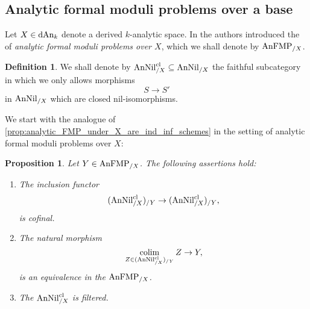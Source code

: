 \documentclass[10pt,a4paper,reqno]{amsart} %
\theoremstyle{plain}
\newtheorem{prop}[thm]{Proposition}
\theoremstyle{definition}
\newtheorem{defin}[thm]{Definition}
\theoremstyle{remark}
\numberwithin{equation}{section}
\begin{document}
\subsection{Analytic formal moduli problems over a base}
Let $X \in \mathrm{dAn}_k$ denote a derived $k$-analytic space. In \cite[Definition 6.11]{Porta_Yu_NQK}
the authors introduced the \infcat of \emph{analytic formal moduli problems over $X$}, which we shall denote by $\mathrm{AnFMP}_{/X}$.

\begin{defin}
    We shall denote by $\mathrm{AnNil}_{/X}^{\mathrm{cl}} \subseteq \mathrm{AnNil}_{/X}$ the faithful subcategory in which we only allows morphisms
        \[
            S \to S'  
        \]
    in $\mathrm{AnNil}_{/X}$ which are closed nil-isomorphisms.
\end{defin}

We start with the analogue of \cref{prop:analytic_FMP_under_X_are_ind_inf_schemes} in the setting of analytic formal moduli problems over $X$:

\begin{prop}
    Let $Y \in \mathrm{AnFMP}_{/X}$. The following assertions hold:
    \begin{enumerate}
        \item The inclusion functor
            \[
                (\mathrm{AnNil}^{\mathrm{cl}}_{/X})_{/Y}  \to (\mathrm{AnNil}^{\mathrm{cl}}_{/X})_{/Y},
            \]
        is cofinal.
        \item The natural morphism
            \[
                \operatorname*{colim}_{Z \in (\mathrm{AnNil}^{\mathrm{cl}}_{/X})_{/Y}}  Z \to Y,
            \]
        is an equivalence in the \infcat $\mathrm{AnFMP}_{/X}$.
        \item The \infcat $\mathrm{AnNil}_{/X}^{\mathrm{cl}}$ is filtered.
    \end{enumerate}
\end{prop}
\end{document}
